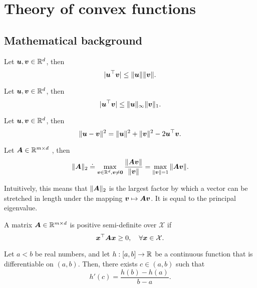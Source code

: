 \section{Theory of convex functions}

\subsection{Mathematical background}

\begin{theorem}
    Let $\bm{u},\bm{v}\in \mathbb{R}^d$, then \[
        |\bm{u}^\top \bm{v}| \leq \|\bm{u}\| \|\bm{v}\|.
    \]
\end{theorem}

\begin{theorem}
    Let $\bm{u}, \bm{v} \in \mathbb{R}^d$, then \[
        |\bm{u}^\top \bm{v}| \leq \| \bm{u} \|_\infty \| \bm{v} \|_1.
    \]
\end{theorem}

\begin{theorem}
    Let $\bm{u}, \bm{v} \in \mathbb{R}^d$, then \[
        \| \bm{u} - \bm{v} \|^2 = \| \bm{u} \|^2 + \| \bm{v} \|^2 - 2 \bm{u}^\top\bm{v}.
    \]
\end{theorem}

\begin{definition}
    Let $\bm{A} \in \mathbb{R}^{m \times d}$ , then \[
        \|\bm{A}\|_2 \doteq \max_{\bm{v}\in \mathbb{R}^d, \bm{v}\neq \bm{0}} \frac{\|\bm{A}\bm{v}\|}{\|\bm{v}\|} = \max_{\|\bm{v}\| = 1} \|\bm{A}\bm{v}\|.
    \]
\end{definition}

Intuitively, this means that $\|\bm{A}\|_2$ is the largest factor by which a vector can be
stretched in length under the mapping $\bm{v}\mapsto\bm{A}\bm{v}$. It is equal to the principal
eigenvalue.

\begin{definition}
    A matrix $\bm{A} \in \mathbb{R}^{m \times d}$ is positive semi-definite over $\mathcal{X}$ if \[
        \bm{x}^\top \bm{A} \bm{x} \geq 0, \quad \forall \bm{x} \in \mathcal{X}.
    \]
\end{definition}

\begin{theorem}
    Let $a<b$ be real numbers, and let $h: [a,b]\to \mathbb{R}$ be a continuous function that is differentiable
    on $(a,b)$. Then, there exists $c\in(a,b)$ such that \[
        h'(c) = \frac{h(b) - h(a)}{b-a}.
    \]
\end{theorem}

